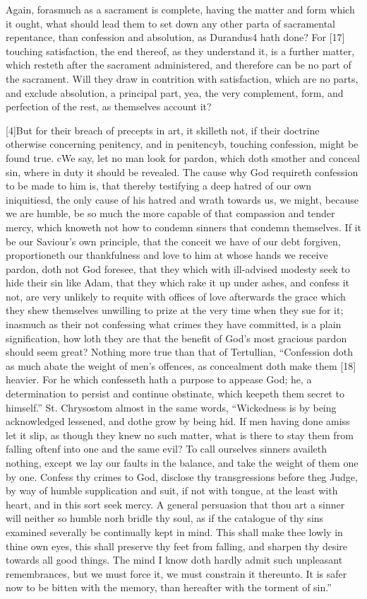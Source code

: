 Again, forasmuch as a sacrament is complete, having the matter and form which it ought, what should lead them to set down any other parta of sacramental repentance, than confession and absolution, as Durandus4 hath done? For [17] touching satisfaction, the end thereof, as they understand it, is a further matter, which resteth after the sacrament administered, and therefore can be no part of the sacrament. Will they draw in contrition with satisfaction, which are no parts, and exclude absolution, a principal part, yea, the very complement, form, and perfection of the rest, as themselves account it?

[4]But for their breach of precepts in art, it skilleth not, if their doctrine otherwise concerning penitency, and in penitencyb, touching confession, might be found true. cWe say, let no man look for pardon, which doth smother and conceal sin, where in duty it should be revealed. The cause why God requireth confession to be made to him is, that thereby testifying a deep hatred of our own iniquitiesd, the only cause of his hatred and wrath towards us, we might, because we are humble, be so much the more capable of that compassion and tender mercy, which knoweth not how to condemn sinners that condemn themselves. If it be our Saviour’s own principle, that the conceit we have of our debt forgiven, proportioneth our thankfulness and love to him at whose hands we receive pardon, doth not God foresee, that they which with ill-advised modesty seek to hide their sin like Adam, that they which rake it up under ashes, and confess it not, are very unlikely to requite with offices of love afterwards the grace which they shew themselves unwilling to prize at the very time when they sue for it; inasmuch as their not confessing what crimes they have committed, is a plain signification, how loth they are that the benefit of God’s most gracious pardon should seem great? Nothing more true than that of Tertullian, “Confession doth as much abate the weight of men’s offences, as concealment doth make them [18] heavier. For he which confesseth hath a purpose to appease God; he, a determination to persist and continue obstinate, which keepeth them secret to himself.” St. Chrysostom almost in the same words, “Wickedness is by being acknowledged lessened, and dothe grow by being hid. If men having done amiss let it slip, as though they knew no such matter, what is there to stay them from falling oftenf into one and the same evil? To call ourselves sinners availeth nothing, except we lay our faults in the balance, and take the weight of them one by one. Confess thy crimes to God, disclose thy transgressions before theg Judge, by way of humble supplication and suit, if not with tongue, at the least with heart, and in this sort seek mercy. A general persuasion that thou art a sinner will neither so humble norh bridle thy soul, as if the catalogue of thy sins examined severally be continually kept in mind. This shall make thee lowly in thine own eyes, this shall preserve thy feet from falling, and sharpen thy desire towards all good things. The mind I know doth hardly admit such unpleasant remembrances, but we must force it, we must constrain it thereunto. It is safer now to be bitten with the memory, than hereafter with the torment of sin.”

